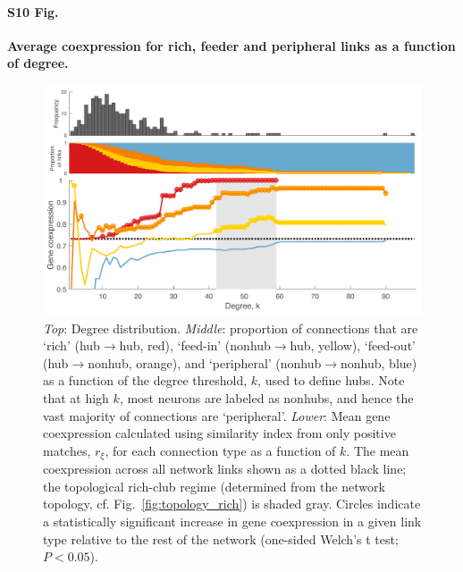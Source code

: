 \documentclass[10pt,letterpaper]{article}
\begin{document}
\paragraph*{S10 Fig.}
{\bf Average coexpression for rich, feeder and peripheral links as a function of degree.}
\begin{figure}[!h]
\label{RFPposmatches}
\centering
    \includegraphics[width=1\textwidth]{coXmeanCoexpression.pdf}
\caption{\emph{Top}: Degree distribution.
\emph{Middle}: proportion of connections that are `rich' (hub$\rightarrow$hub, red), `feed-in' (nonhub$\rightarrow$hub, yellow), `feed-out' (hub$\rightarrow$nonhub, orange), and `peripheral' (nonhub$\rightarrow$nonhub, blue) as a function of the degree threshold, $k$, used to define hubs.
Note that at high $k$, most neurons are labeled as nonhubs, and hence the vast majority of connections are `peripheral'.
\emph{Lower}: Mean gene coexpression calculated using similarity index from only positive matches, $r_\xi$, for each connection type as a function of $k$.
The mean coexpression across all network links shown as a dotted black line; the topological rich-club regime (determined from the network topology, cf. Fig.~\ref{fig:topology_rich}) is shaded gray.
Circles indicate a statistically significant increase in gene coexpression in a given link type relative to the rest of the network (one-sided Welch’s t test; $P < 0.05$).}
\end{figure}
\end{document}
